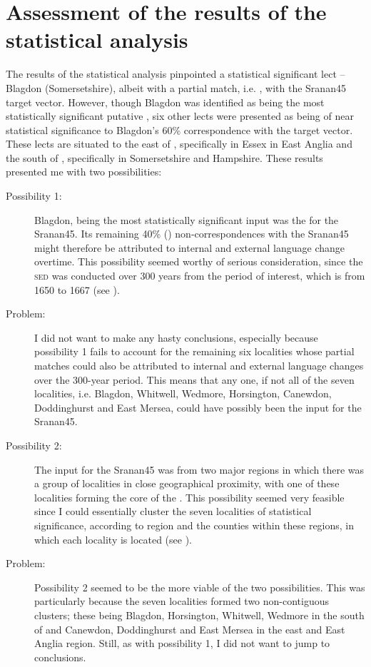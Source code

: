 \section{Assessment of the results of the statistical analysis}
The results of the statistical analysis pinpointed a statistical significant lect -- Blagdon (Somersetshire), albeit with a partial match, i.e. , with the Sranan45 target vector. However, though Blagdon was identified as being the most statistically significant putative , six other lects were presented as being of near statistical significance to Blagdon's 60\% correspondence with the target vector. These lects are situated to the east of , specifically in Essex in East Anglia and the south of , specifically in Somersetshire and Hampshire. These results presented me with two possibilities:

\begin{description}
\item[Possibility 1:] Blagdon, being the most statistically significant input was the  for the Sranan45. Its remaining 40\% () non-correspondences with the Sranan45 might therefore be attributed to internal and external language change overtime. This possibility seemed worthy of serious consideration, since the \textsc{sed} was conducted over 300 years from the period of interest, which is from 1650 to 1667 (see ).
\item[Problem:] I did not want to make any hasty conclusions, especially because possibility 1 fails to account for the remaining six localities whose partial matches could also be attributed to internal and external language changes over the 300-year period. This means that any one, if not all of the seven localities, i.e. Blagdon, Whitwell, Wedmore, Horsington, Canewdon, Doddinghurst and East Mersea, could have possibly been the input for the  Sranan45.
\item[Possibility 2:] The input for the Sranan45 was from two major regions in which there was a group of localities in close geographical proximity, with one of these localities forming the core of the . This possibility seemed very feasible since I could essentially cluster the seven localities of statistical significance, according to region and the counties within these regions, in which each locality is located (see ).
\item[Problem:] Possibility 2 seemed to be the more viable of the two possibilities. This was particularly because the seven localities formed two non-contiguous clusters; these being Blagdon, Horsington, Whitwell, Wedmore in the  south of  and Canewdon, Doddinghurst and East Mersea in the east and East Anglia region. Still, as with possibility 1, I did not want to jump to conclusions.
\end{description}

